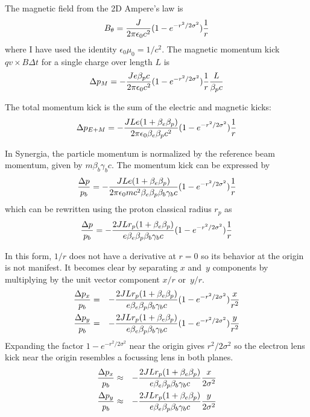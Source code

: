 \documentclass[acus]{jacow}
\begin{document}
The magnetic field from the 2D Ampere's law is
$$
B_\theta = {  J \over {2 \pi \epsilon_0 c^2}} ( 1 - e^{-{{r^2} / {2 \sigma^2}}} )  {1 \over r}
$$
where I have used the identity $\epsilon_0 \mu_0 = 1/c^2$.
The magnetic momentum kick $q v \times B \Delta t$ for a single charge over length $L$ is
$$
\Delta p_M = - {  J e \beta_p c \over {2 \pi \epsilon_0 c^2}} ( 1 - e^{-{{r^2} / {2 \sigma^2}}} )  {1 \over r}{ L \over { \beta_p c }}
$$

The total momentum kick is the sum of the electric and magnetic kicks:
$$
\Delta p_{E+M} = - {  J L e (1 + \beta_e \beta_p) \over {2 \pi \epsilon_0 \beta_e \beta_p c^2}} ( 1 - e^{-{{r^2} / {2 \sigma^2}}} ) {1 \over r}
$$

In Synergia, the particle momentum is normalized by the reference beam momentum, given by $m \beta_b \gamma_b c$.
The momentum kick can be expressed by
$$
{\Delta p \over p_b} = - {  J L e (1 + \beta_e \beta_p) \over {2 \pi \epsilon_0 m c^2 \beta_e \beta_p \beta_b \gamma_b c}} ( 1 - e^{-{{r^2} / {2 \sigma^2}}} ) {1 \over r}
$$
which can be rewritten using the proton classical radius $r_p$ as
$$
{\Delta p \over p_b} = - {  2 J L r_p (1 + \beta_e \beta_p) \over {e \beta_e \beta_p \beta_b \gamma_b c}} ( 1 - e^{-{{r^2} / {2 \sigma^2}}} ) {1 \over r}
$$

In this form, $1/r$ does not have a derivative at $r=0$ so its behavior at the
origin is not manifest.
It becomes clear by separating $x$ and~$y$ components by multiplying by the
unit vector component $x/r$ or~$y/r$.
\begin{eqnarray*}
{\Delta p_x \over p_b} &=& - {  2 J L r_p (1 + \beta_e \beta_p) \over {e \beta_e \beta_p \beta_b \gamma_b c}} ( 1 - e^{-{{r^2} / {2 \sigma^2}}} ) {x \over {r^2}} \\
{\Delta p_y \over p_b} &=& - {  2 J L r_p (1 + \beta_e \beta_p) \over {e \beta_e \beta_p \beta_b \gamma_b c}} ( 1 - e^{-{{r^2} / {2 \sigma^2}}} ) {y \over {r^2}}\\
\end{eqnarray*}
Expanding the factor $1 - e^{-{r^2}/{2 \sigma^2}}$ near the origin gives $r^2/2\sigma^2$ so the electron lens kick near the origin resembles a focussing lens in both planes.
\begin{eqnarray*}
{\Delta p_x \over p_b} &\approx& - {  2 J L r_p (1 + \beta_e \beta_p) \over {e \beta_e \beta_p \beta_b \gamma_b c}}  {x \over {2 \sigma^2}} \\
{\Delta p_y \over p_b} &\approx& - {  2 J L r_p (1 + \beta_e \beta_p) \over {e \beta_e \beta_p \beta_b \gamma_b c}} {y \over {2\sigma^2}}\\
\end{eqnarray*}
\end{document}
